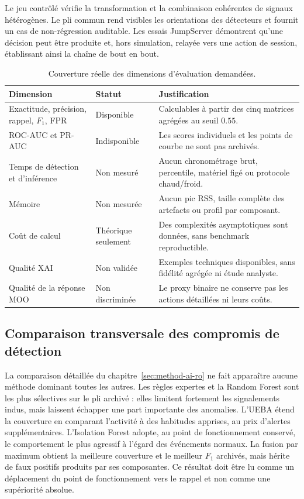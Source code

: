 \documentclass[11pt,a4paper,oneside]{report}
\theoremstyle{definition}
\theoremstyle{plain}
\begin{document}
Le jeu contrôlé vérifie la transformation et la combinaison cohérentes de
signaux hétérogènes. Le pli commun rend visibles les orientations des
détecteurs et fournit un cas de non-régression auditable. Les essais
JumpServer démontrent qu'une décision peut être produite et, hors simulation,
relayée vers une action de session, établissant ainsi la chaîne de bout en
bout.

\begin{table}[H]
\centering
\small
\caption{Couverture réelle des dimensions d'évaluation demandées.}
\label{tab:validation-metric-coverage}
\begin{tabularx}{\textwidth}{@{}p{3.4cm}p{2.2cm}X@{}}
\toprule
\textbf{Dimension} & \textbf{Statut} & \textbf{Justification}\\
\midrule
Exactitude, précision, rappel, $F_1$, FPR & Disponible &
Calculables à partir des cinq matrices agrégées au seuil $0.55$.\\
ROC-AUC et PR-AUC & Indisponible &
Les scores individuels et les points de courbe ne sont pas archivés.\\
Temps de détection et d'inférence & Non mesuré &
Aucun chronométrage brut, percentile, matériel figé ou protocole chaud/froid.\\
Mémoire & Non mesurée &
Aucun pic RSS, taille complète des artefacts ou profil par composant.\\
Coût de calcul & Théorique seulement &
Des complexités asymptotiques sont données, sans benchmark reproductible.\\
Qualité XAI & Non validée &
Exemples techniques disponibles, sans fidélité agrégée ni étude analyste.\\
Qualité de la réponse MOO & Non discriminée &
Le proxy binaire ne conserve pas les actions détaillées ni leurs coûts.\\
\bottomrule
\end{tabularx}
\end{table}


\subsection{Comparaison transversale des compromis de détection}
\label{sec:validation-detection}

La comparaison détaillée du chapitre~\ref{sec:method-ai-ro} ne fait apparaître aucune
méthode dominant toutes les autres. Les règles expertes et la Random Forest
sont les plus sélectives sur le pli archivé : elles limitent fortement les
signalements indus, mais laissent échapper une part importante des anomalies.
L'UEBA étend la couverture en comparant l'activité à des habitudes apprises,
au prix d'alertes supplémentaires. L'Isolation Forest adopte, au point de
fonctionnement conservé, le comportement le plus agressif à l'égard des
événements normaux. La fusion par maximum obtient la meilleure couverture et
le meilleur \(F_1\) archivés, mais hérite de faux positifs produits par ses
composantes. Ce résultat doit être lu comme un déplacement du point de
fonctionnement vers le rappel et non comme une supériorité absolue.
\end{document}
